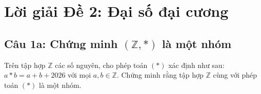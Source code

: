 
\section*{Lời giải Đề 2: Đại số đại cương}

\subsection*{Câu 1a: Chứng minh $(\mathbb{Z}, *)$ là một nhóm}

\begin{questionbox}
Trên tập hợp $\mathbb{Z}$ các số nguyên, cho phép toán $(*)$ xác định như sau: $a * b = a + b + 2026$ với mọi $a, b \in \mathbb{Z}$. Chứng minh rằng tập hợp $\mathbb{Z}$ cùng với phép toán $(*)$ là một nhóm.
\end{questionbox}

